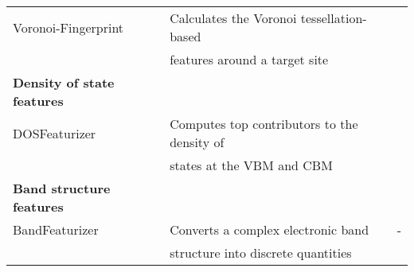 \begin{center}
\begin{longtable}{M{3.5cm} M{6.5cm} M{2.0cm}}
  Voronoi-Fingerprint & Calculates the Voronoi tessellation-based  & \cite{Peng2011,Wang2019} \\
   & features around a target site & \\ 
\hline     
  \textbf{Density of state features} & & \\
  DOSFeaturizer & Computes top contributors to the density of  & \cite{Dylla2020} \\ 
  & states at the VBM and CBM  & \\ 
  \hline  
  \textbf{Band structure features} & & \\
  BandFeaturizer & Converts a complex electronic band  & - \\ 
   &structure into discrete quantities  & \\ 
\hline 
\end{longtable}
\end{center}
